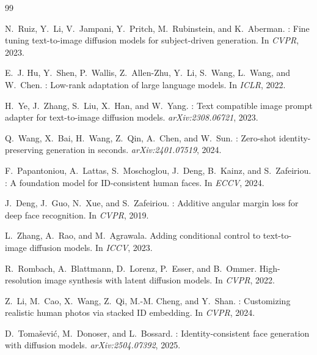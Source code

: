 \documentclass[10pt,twocolumn]{article}
\begin{document}

\begin{thebibliography}{99}

N.~Ruiz, Y.~Li, V.~Jampani, Y.~Pritch, M.~Rubinstein, and K.~Aberman.
: Fine tuning text-to-image diffusion models for subject-driven generation.
\newblock In \textit{CVPR}, 2023.

E.~J. Hu, Y.~Shen, P.~Wallis, Z.~Allen-Zhu, Y.~Li, S.~Wang, L.~Wang, and W.~Chen.
: Low-rank adaptation of large language models.
\newblock In \textit{ICLR}, 2022.

H.~Ye, J.~Zhang, S.~Liu, X.~Han, and W.~Yang.
: Text compatible image prompt adapter for text-to-image diffusion models.
\newblock \textit{arXiv:2308.06721}, 2023.

Q.~Wang, X.~Bai, H.~Wang, Z.~Qin, A.~Chen, and W.~Sun.
: Zero-shot identity-preserving generation in seconds.
\newblock \textit{arXiv:2401.07519}, 2024.

F.~Papantoniou, A.~Lattas, S.~Moschoglou, J.~Deng, B.~Kainz, and S.~Zafeiriou.
: A foundation model for {ID}-consistent human faces.
\newblock In \textit{ECCV}, 2024.

J.~Deng, J.~Guo, N.~Xue, and S.~Zafeiriou.
: Additive angular margin loss for deep face recognition.
\newblock In \textit{CVPR}, 2019.

L.~Zhang, A.~Rao, and M.~Agrawala.
\newblock Adding conditional control to text-to-image diffusion models.
\newblock In \textit{ICCV}, 2023.

R.~Rombach, A.~Blattmann, D.~Lorenz, P.~Esser, and B.~Ommer.
\newblock High-resolution image synthesis with latent diffusion models.
\newblock In \textit{CVPR}, 2022.

Z.~Li, M.~Cao, X.~Wang, Z.~Qi, M.-M. Cheng, and Y.~Shan.
: Customizing realistic human photos via stacked {ID} embedding.
\newblock In \textit{CVPR}, 2024.

D.~Tomašević, M.~Donoser, and L.~Bossard.
: Identity-consistent face generation with diffusion models.
\newblock \textit{arXiv:2504.07392}, 2025.


\end{thebibliography}
\end{document}
